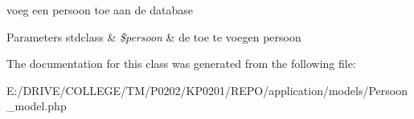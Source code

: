 voeg een persoon toe aan de database 
\begin{DoxyParams}[1]{Parameters}
stdclass & {\em \$persoon} & de toe te voegen persoon \\
\hline
\end{DoxyParams}


The documentation for this class was generated from the following file\+:\begin{DoxyCompactItemize}
\item 
E\+:/\+D\+R\+I\+V\+E/\+C\+O\+L\+L\+E\+G\+E/\+T\+M/\+P0202/\+K\+P0201/\+R\+E\+P\+O/application/models/Persoon\+\_\+model.\+php\end{DoxyCompactItemize}
